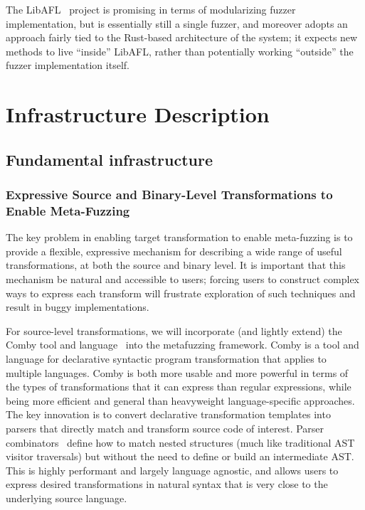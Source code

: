 The LibAFL~\cite{libafl} project is promising in terms of modularizing fuzzer
implementation, but is essentially still a single fuzzer, and moreover adopts
an approach fairly tied to the Rust-based architecture of the system;
it expects new methods to live ``inside'' LibAFL, rather than
potentially working ``outside'' the fuzzer implementation itself.

\section{Infrastructure Description}

\subsection{Fundamental infrastructure}




\subsubsection{Expressive Source and Binary-Level Transformations to 
Enable Meta-Fuzzing}

The key problem in enabling target transformation to enable meta-fuzzing is to
provide a flexible, expressive mechanism for describing a wide range of useful
transformations, at both the source and binary level.  It is important that this
mechanism be natural and accessible to users; forcing users to 
construct complex ways to express each transform will frustrate exploration of such 
techniques and result in buggy implementations. 

For source-level transformations, we will incorporate (and lightly extend) the
Comby tool and language~\cite{rvt-ppc,comby-github} into the metafuzzing
framework.  Comby is a tool and language for declarative syntactic program
transformation that applies to multiple languages. Comby is both more usable and
more powerful in terms of the types of transformations that it can express than
regular expressions, while being more efficient and general than heavyweight
language-specific approaches. The key innovation is to convert declarative
transformation templates into parsers that directly match and transform source
code of interest. Parser combinators~\cite{Hutton96monadicparser} define how to
match nested structures (much like traditional AST visitor traversals) but
without the need to define or build an intermediate AST. This is highly
performant and largely language agnostic, and allows users to express desired
transformations in natural syntax that is very close to the underlying source
language. 

